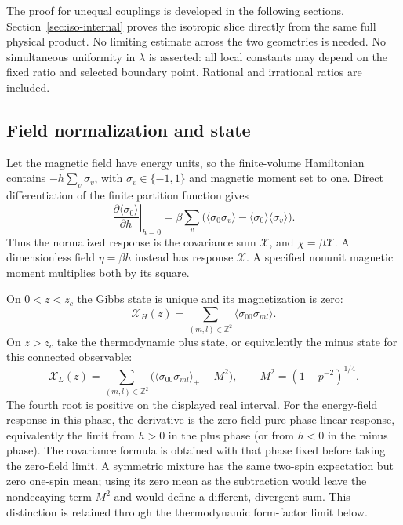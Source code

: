 \documentclass[11pt]{article}
\numberwithin{equation}{section}
\theoremstyle{definition}
\newcommand{\Z}{\mathbb Z}
\newcommand{\XH}{\mathcal X_H}
\newcommand{\XL}{\mathcal X_L}
\begin{document}
The proof for unequal couplings is developed in the following sections.
Section~\ref{sec:iso-internal} proves the isotropic slice directly from
the same full physical product. No limiting estimate across the two
geometries is needed. No simultaneous uniformity in $\lambda$ is asserted:
all local constants may depend on the fixed ratio and selected boundary
point. Rational and irrational ratios are included.

\subsection{Field normalization and state}
Let the magnetic field have energy units, so the finite-volume Hamiltonian
contains $-h\sum_v\sigma_v$, with $\sigma_v\in\{-1,1\}$ and magnetic
moment set to one. Direct differentiation of the finite partition
function gives
\[
 \left.\frac{\partial\langle\sigma_0\rangle}{\partial h}\right|_{h=0}
 =\beta\sum_v\bigl(\langle\sigma_0\sigma_v\rangle
                         -\langle\sigma_0\rangle\langle\sigma_v\rangle\bigr).
\]
Thus the normalized response is the covariance sum $\mathcal X$, and
$\chi=\beta\mathcal X$. A dimensionless field $\eta=\beta h$ instead
has response $\mathcal X$. A specified nonunit magnetic moment multiplies
both by its square.

On $0<z<z_c$ the Gibbs state is unique and its magnetization is zero:
\[
 \XH(z)=\sum_{(m,l)\in\Z^2}\langle\sigma_{00}\sigma_{ml}\rangle.
\]
On $z>z_c$ take the thermodynamic plus state, or equivalently the minus
state for this connected observable:
\[
 \XL(z)=\sum_{(m,l)\in\Z^2}
       \bigl(\langle\sigma_{00}\sigma_{ml}\rangle_+-M^2\bigr),
 \qquad M^2=(1-p^{-2})^{1/4}.
\]
The fourth root is positive on the displayed real interval.
For the energy-field response in this phase, the derivative is the
zero-field pure-phase linear response, equivalently the limit from
$h>0$ in the plus phase (or from $h<0$ in the minus phase).
The covariance formula is obtained with that phase fixed before taking
the zero-field limit. A symmetric
mixture has the same two-spin expectation but zero one-spin mean; using
its zero mean as the subtraction would leave the nondecaying term $M^2$
and would define a different, divergent sum. This distinction is retained
through the thermodynamic form-factor limit below.
\end{document}

